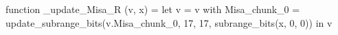 function _update_Misa_R (v, x) = let v = { v with Misa_chunk_0 = update_subrange_bits(v.Misa_chunk_0, 17, 17, subrange_bits(x, 0, 0)) } in
  v
